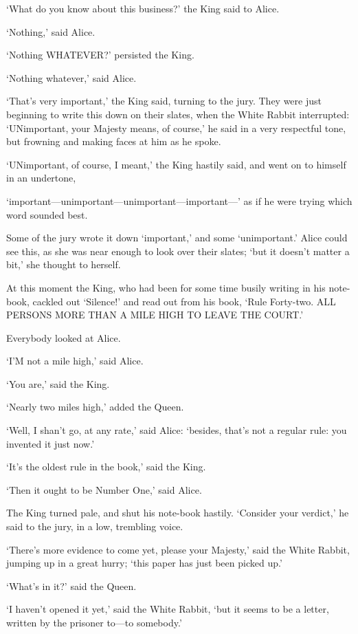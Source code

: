 \documentclass[12pt]{article}
\begin{document}
\begin{Parallel}[p]{}{}
{‘What do you know about this business?’ the King said to Alice.

‘Nothing,’ said Alice.

‘Nothing WHATEVER?’ persisted the King.

‘Nothing whatever,’ said Alice.

‘That’s very important,’ the King said, turning to the jury. They were just beginning to write this down on their slates, when the White Rabbit interrupted: ‘UNimportant, your Majesty means, of course,’ he said in a very respectful tone, but frowning and making faces at him as he spoke.

‘UNimportant, of course, I meant,’ the King hastily said, and went on to himself in an undertone,

‘important—unimportant—unimportant—important—’ as if he were trying which word sounded best.

Some of the jury wrote it down ‘important,’ and some ‘unimportant.’ Alice could see this, as she was near enough to look over their slates; ‘but it doesn’t matter a bit,’ she thought to herself.

At this moment the King, who had been for some time busily writing in his note-book, cackled out ‘Silence!’ and read out from his book, ‘Rule Forty-two. ALL PERSONS MORE THAN A MILE HIGH TO LEAVE THE COURT.’

Everybody looked at Alice.

‘I’M not a mile high,’ said Alice.

‘You are,’ said the King.

‘Nearly two miles high,’ added the Queen.

‘Well, I shan’t go, at any rate,’ said Alice: ‘besides, that’s not a regular rule: you invented it just now.’

‘It’s the oldest rule in the book,’ said the King.

‘Then it ought to be Number One,’ said Alice.

The King turned pale, and shut his note-book hastily. ‘Consider your verdict,’ he said to the jury, in a low, trembling voice.

‘There’s more evidence to come yet, please your Majesty,’ said the White Rabbit, jumping up in a great hurry; ‘this paper has just been picked up.’

‘What’s in it?’ said the Queen.

‘I haven’t opened it yet,’ said the White Rabbit, ‘but it seems to be a letter, written by the prisoner to—to somebody.’

}
\end{Parallel}
\end{document}
